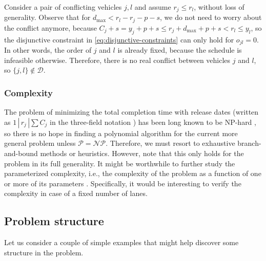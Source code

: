 \documentclass{article}
\theoremstyle{definition}
\theoremstyle{plain}
\begin{document}
Consider a pair of conflicting vehicles $j, l$ and assume $r_{j} \leq r_{l}$,
without loss of generality. Observe that for
$d_{\text{max}} < r_{l} - r_{j} - p - s$, we do not need to worry about the
conflict anymore, because
$C_{j} + s = y_{j} + p + s \leq r_{j} + d_{\text{max}} + p + s < r_{l} \leq y_{l}$,
so the disjunctive constraint in \eqref{eq:disjunctive-constraints} can only
hold for $o_{jl} = 0$. In other words, the order of $j$ and $l$ is already
fixed, because the schedule is infeasible otherwise. Therefore, there is no real
conflict between vehicles $j$ and $l$, so $\{j, l\} \notin \mathcal{D}$.


\subsubsection{Complexity}
The problem of minimizing the total completion time with release dates (written
as $1 \, | \, r_{j} \, | \sum C_{j}$ in the three-field notation
\cite{grahamOptimizationApproximationDeterministic1979}) has been long known to
be NP-hard \cite{lenstraComplexityMachineScheduling1977}, so there is no hope in
finding a polynomial algorithm for the current more general problem unless
$\mathcal{P} = \mathcal{NP}$. Therefore, we must resort to exhaustive
branch-and-bound methods or heuristics. However, note that this only holds for
the problem in its full generality. It might be worthwhile to further study the
parameterized complexity, i.e., the complexity of the problem as a function of
one or more of its parameters \cite{cyganParameterizedAlgorithms2015}.
Specifically, it would be interesting to verify the complexity in case of a
fixed number of lanes.


\subsection{Problem structure}
Let us consider a couple of simple examples that might help discover some structure in the problem.
\end{document}
